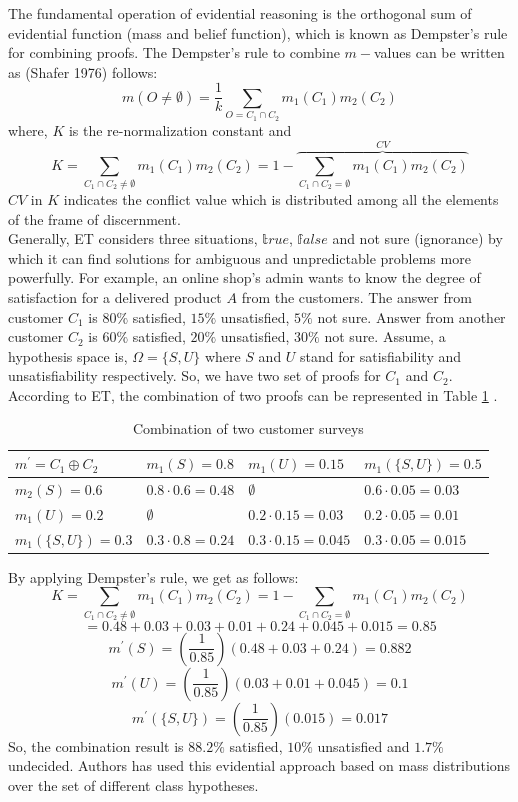 The fundamental operation of evidential reasoning is the orthogonal sum of evidential function (mass and belief function), which is known as Dempster's rule for combining proofs\cite{Bell_4028391}. The Dempster's rule to combine $m-$values can be written as (Shafer 1976) follows\cite{srivastava2011introduction}:
 $$m(O \neq \emptyset) = \frac{1}{k}  \sum_{O=C_{1} \cap C_{2}} m_{1}(C_{1})m_{2}(C_{2})$$
where, $K$ is the re-normalization constant and 
$$K = \sum_{C_{1} \cap C_{2} \neq \emptyset} m_{1}(C_{1})m_{2}(C_{2}) = 1-\overbrace{ \sum_{C_{1} \cap C_{2} = \emptyset} m_{1}(C_{1})m_{2}(C_{2})}^{CV}$$
$CV$ in $K$ indicates the conflict value which is distributed among all the elements of the frame of discernment\cite{Chavez_Garcia_2016}.\\
Generally, ET considers three situations, $\mathbb true$, $\mathbb false$ and not sure (ignorance) by which it can find solutions for ambiguous and unpredictable problems more powerfully. For example, an online shop's admin wants to know the degree of satisfaction for a delivered product $A$ from the customers. The answer from customer $C_{1}$ is $80\%$ satisfied, $15\%$ unsatisfied, $5\%$ not sure. Answer from another customer $C_{2}$ is $60\%$ satisfied, $20\%$ unsatisfied, $30\%$ not sure. Assume, a hypothesis space is, $\Omega = \{S, U\}$ where $S$ and $U$ stand for satisfiability and unsatisfiability respectively. So, we have two set of proofs for $C_{1}$ and $C_{2}$. According to ET, the combination of two proofs can be represented in Table \ref{table:customer_surv} \cite{Bell_4028391}.
\begin{table}[]
\centering
\caption{Combination of two customer surveys}
\label{table:customer_surv}
\begin{tabular}{|l|l|l|l|}
\hline
 $m^{\prime}=C_{1}\oplus C_{2}$&  $m_{1}(S)=0.8$ & $m_{1}(U)=0.15$ & $m_{1}(\{S, U\})=0.5$ \\ \hline
 $m_{2}(S)=0.6$& $0.8\cdot 0.6=0.48$ & $\emptyset$ & $0.6\cdot 0.05=0.03$ \\ \hline
 $m_{1}(U)=0.2$& $\emptyset$ & $0.2\cdot 0.15=0.03$ & $0.2\cdot 0.05=0.01$ \\ \hline
 $m_{1}(\{S, U\})=0.3$& $0.3\cdot 0.8=0.24$ & $0.3\cdot 0.15=0.045$ & $0.3\cdot 0.05=0.015$ \\ \hline
\end{tabular}
\end{table}
By applying Dempster's rule, we get as follows:
$$K = \sum_{C_{1} \cap C_{2} \neq \emptyset} m_{1}(C_{1})m_{2}(C_{2}) = 1- \sum_{C_{1} \cap C_{2} = \emptyset} m_{1}(C_{1})m_{2}(C_{2})$$
$$=0.48 + 0.03 + 0.03 + 0.01 + 0.24 + 0.045 + 0.015 = 0.85$$
$$m^{\prime}(S)=(\frac{1}{0.85})(0.48 + 0.03 + 0.24) = 0.882$$
$$m^{\prime}(U)=(\frac{1}{0.85})(0.03+0.01+0.045) = 0.1$$
$$m^{\prime}(\{S, U\})=(\frac{1}{0.85})(0.015) = 0.017$$
So, the combination result is $88.2\%$ satisfied, $10\%$ unsatisfied and $1.7\%$ undecided. Authors has used this evidential approach based on mass distributions over the set of different class hypotheses\cite{Chavez_Garcia_2016}.

